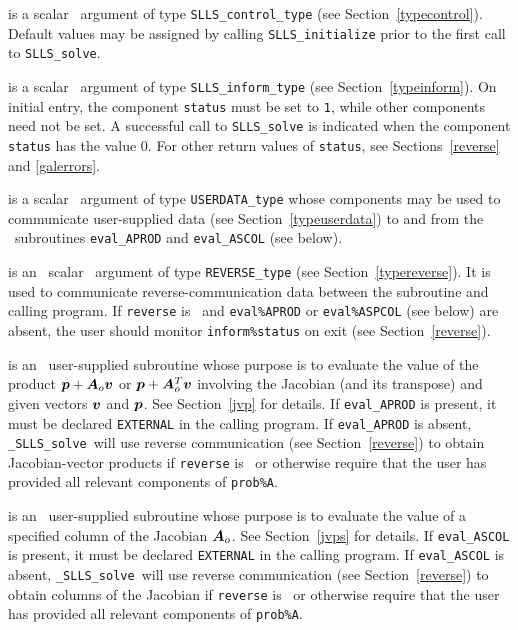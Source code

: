 \documentclass{galahad}
\newcommand{\packagename}{SLLS}
\newcommand{\fullpackagename}{\libraryname\_\packagename}
\newcommand{\solver}{{\tt \fullpackagename\_solve}}
\begin{document}
\begin{description}
 is a scalar \intentin\ argument of type
{\tt \packagename\_control\_type}
(see Section~\ref{typecontrol}). Default values may be assigned by calling
{\tt \packagename\_initialize} prior to the first call to
{\tt \packagename\_solve}.

 is a scalar \intentinout\ argument of type
{\tt \packagename\_inform\_type}
(see Section~\ref{typeinform}). On initial entry, the component {\tt status}
must be set to {\tt 1}, while other components need not be set.
A successful call to
{\tt \packagename\_solve}
is indicated when the  component {\tt status} has the value 0.
For other return values of {\tt status}, see Sections~\ref{reverse} and
\ref{galerrors}.

 is a scalar \intentinout\ argument of type
{\tt USERDATA\_type} whose components may be used
to communicate user-supplied data
(see Section~\ref{typeuserdata})
to and from the \optional\ subroutines
 {\tt eval\_APROD} and {\tt eval\_ASCOL} (see below).

 is an \optional\ scalar \intentinout\ argument of type
{\tt REVERSE\_type}
(see Section~\ref{typereverse}).
It is used to communicate reverse-communication data between the
subroutine and calling program.
If {\tt reverse} is \present\ and {\tt eval\%APROD} or {\tt eval\%ASPCOL}
(see below) are absent, the user should monitor {\tt inform\%status} on exit
(see Section~\ref{reverse}).

 is an \optional\
user-supplied subroutine whose purpose is to evaluate the value of the
product ${\bm{p}} + {\bm{A}}_o {\bm{v}}$ or ${\bm{p}} + {\bm{A}}_o^T {\bm{v}}$
involving the Jacobian (and its transpose) and given vectors ${\bm{v}}$ and ${\bm{p}}$.
See Section~\ref{jvp} for details.
If {\tt eval\_APROD} is present,
it must be declared {\tt EXTERNAL} in the calling program.
If {\tt eval\_APROD} is absent, \solver\ will use reverse communication
(see Section~\ref{reverse})
to obtain Jacobian-vector products if {\tt reverse} is \present\ or
otherwise require that the user has provided all relevant
components of {\tt prob\%A}.

 is an \optional\
user-supplied subroutine whose purpose is to evaluate the value of a
specified column of the Jacobian ${\bm{A}}_o$.
See Section~\ref{jvps} for details.
If {\tt eval\_ASCOL} is present,
it must be declared {\tt EXTERNAL} in the calling program.
If {\tt eval\_ASCOL} is absent, \solver\ will use reverse communication
(see Section~\ref{reverse})
to obtain columns of the Jacobian if {\tt reverse} is \present\ or
otherwise require that the user has provided all relevant
components of {\tt prob\%A}.


\end{description}
\end{document}
